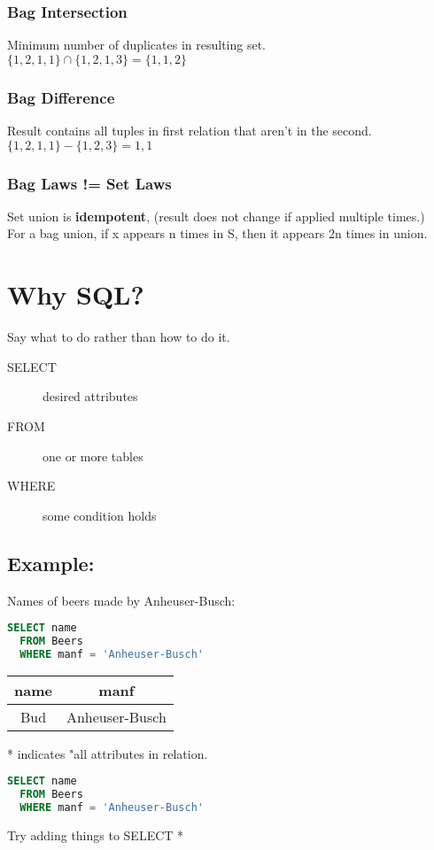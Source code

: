 \documentclass[12pt]{article}
\begin{document}
\subsubsection{Bag Intersection}
Minimum number of duplicates in resulting set.\\
$\{1,2,1,1\} \cap \{1,2,1,3\} = \{1,1,2\}$
\subsubsection{Bag Difference}
Result contains all tuples in first relation that aren't in the second.\\
$\{1,2,1,1\} - \{1,2,3\} = {1,1}$
\subsubsection{Bag Laws != Set Laws}
Set union is \textbf{idempotent}, (result does not change if applied multiple
times.)\\
For a bag union, if x appears n times in S, then it appears 2n times in union.

\section{Why SQL?}
Say what to do rather than how to do it.
\begin{description}
    \item[SELECT]{desired attributes}
    \item[FROM]{one or more tables}
    \item[WHERE]{some condition holds}
\end{description}
\subsection{Example:}
Names of beers made by Anheuser-Busch:
\begin{lstlisting}[language=SQL]
  SELECT name
  FROM Beers
  WHERE manf = 'Anheuser-Busch'
\end{lstlisting}

\begin{table}[H]
  \begin{tabular}{|c|c|}
    \hline
    name & manf\\
    \hline
    Bud & Anheuser-Busch\\
    \hline
\end{tabular}
\end{table}

* indicates "all attributes in relation.
\begin{lstlisting}[language=SQL]
  SELECT name
  FROM Beers
  WHERE manf = 'Anheuser-Busch'
\end{lstlisting}
Try adding things to SELECT *
\end{document}

